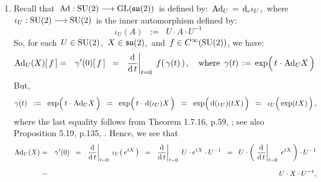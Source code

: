 \proof
\begin{enumerate}
\item
	Recall that
	\,$\textnormal{Ad} : \textnormal{SU}(2) \longrightarrow \textnormal{GL}(\mathfrak{su}(2))$\,
	is defined by:
	\,$\textnormal{Ad}_{U} \,=\, \textnormal{d}_{e}\iota_{U}$,\,
	where
	\,$\iota_{U} : \textnormal{SU}(2) \longrightarrow \textnormal{SU}(2)$\,
	is the inner automorphism defined by:
	\begin{equation*}
	\iota_{U}(A) \;\; := \;\; U \cdot A \cdot U^{-1}
	\end{equation*}
	So, for each
	\,$U \in \textnormal{SU}(2)$,\, $X \in \mathfrak{su}(2)$,\, and \,$f \in C^{\infty}(\textnormal{SU}(2))$, we have:
	\begin{eqnarray*}
	\textnormal{Ad}_{U}(X)[\,f\,]
	& = &
		\gamma^{\prime}(0)[\,f\,]
	\;\; = \;\;
		\left.\dfrac{\d}{\d\,t}\right\vert_{t = 0}\;
		f\!\left(\,\gamma(t)\,\right),
		\quad
		\textnormal{where \,$\gamma(t) \,:=\, \exp\!\left(\,t\overset{{\color{white}1}}{\cdot}\textnormal{Ad}_{U}X\,\right)$}
	\end{eqnarray*}
	But,
	\begin{equation*}
	\gamma(t)
	\;\; := \;\;
		\exp\!\left(\,t\overset{{\color{white}1}}{\cdot}\textnormal{Ad}_{U}X\,\right)
	\;\; = \;\;
		\exp\!\left(\,t\overset{{\color{white}1}}{\cdot}\d(\iota_{U})X\,\right)
	\;\; = \;\;
		\exp\!\left(\,\d(\overset{{\color{white}1}}{\iota}_{U})(tX)\,\right)
	\;\; = \;\;
		\iota_{U}\!\left(\,\overset{{\color{white}1}}{\exp}(tX)\,\right),
	\end{equation*}
	where the last equality follows from Theorem 1.7.16, p.59, \cite{Hamilton2017};
	see also Proposition 5.19, p.135, \cite{Sagle1973}.
	Hence, we see that
	\begin{eqnarray*}
	\textnormal{Ad}_{U}(X)
	& = &
		\gamma^{\prime}(0)
	\;\; = \;\;
		\left.\dfrac{\d}{\d\,t}\right\vert_{t = 0}\;
		\iota_{U}\!\left(\,e^{tX}\,\right)
	\;\; = \;\;
		\left.\dfrac{\d}{\d\,t}\right\vert_{t = 0}\;
		U \cdot e^{tX} \cdot U^{-1}
	\;\; = \;\;
		U \cdot \left(\,\left.\dfrac{\d}{\d\,t}\right\vert_{t=0}\;e^{tX}\,\right) \cdot U^{-1}
	\\
	& = &
		\overset{{\color{white}\textnormal{\normalsize$1$}}}{U} \cdot X \cdot U^{-1},
	\end{eqnarray*}

\end{enumerate}
